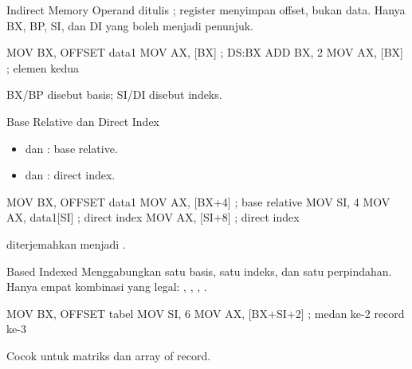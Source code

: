 \documentclass[aspectratio=169,11pt]{beamer}
\begin{document}

\begin{frame}[fragile]{Indirect Memory}
\small
Operand ditulis \code{[register]}; register menyimpan offset, bukan
data. Hanya BX, BP, SI, dan DI yang boleh menjadi penunjuk.

\vspace{0.2em}
\begin{kodeasm}[numbers=none]
MOV BX, OFFSET data1
MOV AX, [BX]        ; DS:BX
ADD BX, 2
MOV AX, [BX]        ; elemen kedua
\end{kodeasm}

\vspace{0.15em}
{\footnotesize\color{obeGray}BX/BP disebut basis; SI/DI disebut
indeks.\par}
\end{frame}

\begin{frame}[fragile]{Base Relative dan Direct Index}
\small
\begin{itemize}
    \item \code{[BX+disp]} dan \code{[BP+disp]}: base relative.
    \item \code{[SI+disp]} dan \code{[DI+disp]}: direct index.
\end{itemize}

\vspace{0.2em}
\begin{kodeasm}[numbers=none]
MOV BX, OFFSET data1
MOV AX, [BX+4]      ; base relative
MOV SI, 4
MOV AX, data1[SI]   ; direct index
MOV AX, [SI+8]      ; direct index
\end{kodeasm}

\vspace{0.1em}
{\footnotesize\color{obeGray} diterjemahkan menjadi
\code{[data1+SI]}.\par}
\end{frame}

\begin{frame}[fragile]{Based Indexed}
\small
Menggabungkan satu basis, satu indeks, dan satu perpindahan. Hanya
empat kombinasi yang legal:
\code{[BX+SI]}, \code{[BX+DI]}, \code{[BP+SI]}, \code{[BP+DI]}.

\vspace{0.2em}
\begin{kodeasm}[numbers=none]
MOV BX, OFFSET tabel
MOV SI, 6
MOV AX, [BX+SI+2]   ; medan ke-2 record ke-3
\end{kodeasm}

\vspace{0.1em}
{\footnotesize\color{obeGray}Cocok untuk matriks dan array of
record.\par}
\end{frame}
\end{document}
